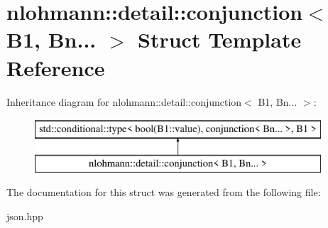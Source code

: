 \hypertarget{structnlohmann_1_1detail_1_1conjunction_3_01_b1_00_01_bn_8_8_8_01_4}{}\section{nlohmann\+:\+:detail\+:\+:conjunction$<$ B1, Bn... $>$ Struct Template Reference}
\label{structnlohmann_1_1detail_1_1conjunction_3_01_b1_00_01_bn_8_8_8_01_4}
Inheritance diagram for nlohmann\+:\+:detail\+:\+:conjunction$<$ B1, Bn... $>$\+:\begin{figure}[H]
\begin{center}
\leavevmode
\includegraphics[height=2.000000cm]{structnlohmann_1_1detail_1_1conjunction_3_01_b1_00_01_bn_8_8_8_01_4}
\end{center}
\end{figure}


The documentation for this struct was generated from the following file\+:\begin{DoxyCompactItemize}
\item 
json.\+hpp\end{DoxyCompactItemize}
